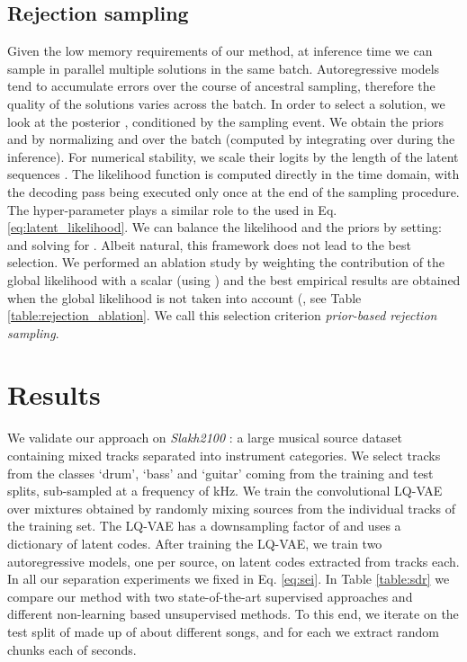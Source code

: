 \documentclass[a4paper]{article}
\begin{document}
\subsection{Rejection sampling}

Given the low memory requirements of our method, at inference time we can sample in parallel multiple solutions  in the same batch. Autoregressive models tend to accumulate errors over the course of ancestral sampling, therefore the quality of the solutions varies across the batch. 
In order to select a solution, we look at the posterior , conditioned by the sampling event. We obtain the priors  and  by normalizing  and  over the batch (computed by integrating over  during the inference). For numerical stability, we scale their logits by the length of the latent sequences . The likelihood function  is computed directly in the time domain, with the decoding pass being executed only once at the end of the sampling procedure. The hyper-parameter  plays a similar role to the  used in Eq. \eqref{eq:latent_likelihood}. We can balance the likelihood and the priors by setting:
 and solving for . Albeit natural, this framework does not lead to the best selection. We performed an ablation study by weighting the contribution of the global likelihood with a scalar  (using ) and the best empirical results are obtained when the global likelihood is not taken into account (, see Table \ref{table:rejection_ablation}.  We call this selection criterion \textit{prior-based rejection sampling}.

%
 \section{Results}
\label{sec:experiments}

We validate our approach on \textit{Slakh2100}  \cite{manilow2019}: 
a large musical source dataset containing mixed tracks separated into  instrument categories. We select tracks from the classes `drum', `bass' and `guitar' coming from the training and test splits, sub-sampled at a frequency of kHz. We train the convolutional LQ-VAE over mixtures obtained by randomly mixing sources from the individual tracks of the training set. The LQ-VAE has a downsampling factor of  and uses a dictionary of  latent codes. After training the LQ-VAE, we train two autoregressive models, one per source, on latent codes extracted from  tracks each. In all our separation experiments we fixed  in Eq. \eqref{eq:sei}.
In Table \ref{table:sdr} we compare our method with two state-of-the-art supervised approaches and different non-learning based unsupervised methods. To this end, we iterate on the test split of \cite{manilow2019} made up of about  different songs, and for each we extract  random chunks each of  seconds. 
\end{document}
